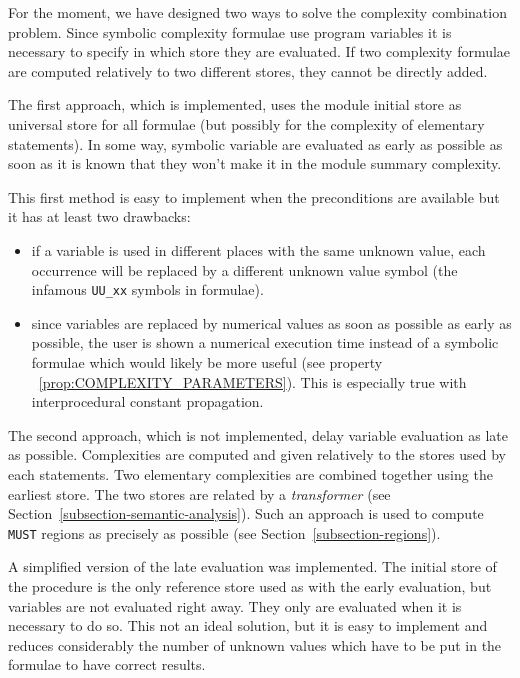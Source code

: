 \documentclass[a4paper]{report}
\newcommand{\PipsPropRef}[1]{\texttt{\detokenize{#1}}~\ref{prop:#1}}
\begin{document}
For the moment, we have designed two ways to solve the complexity
combination problem. Since symbolic complexity formulae use program
variables it is necessary to specify in which store they are
evaluated. If two complexity formulae are computed relatively to two
different stores, they cannot be directly added.

The first approach, which is implemented, uses the module initial store
as universal store for all formulae (but possibly for the complexity of
elementary statements).  In some way, symbolic variable are evaluated as
early as possible as soon as it is known that they won't make it in the
module summary complexity.

This first method is easy to implement when the preconditions are available
but it has at least two drawbacks:

\begin{itemize}

  \item if a variable is used in different places with the same unknown
value, each occurrence will be replaced by a different unknown value
symbol (the infamous \verb+UU_xx+ symbols in formulae).

  \item since variables are replaced by numerical values as soon as
possible as early as possible, the user is shown a numerical execution
time instead of a symbolic formulae which would likely be more useful
(see property \PipsPropRef{COMPLEXITY_PARAMETERS}). This is especially true
with interprocedural constant propagation.

\end{itemize}

The second approach, which is not implemented, delay variable evaluation
as late as possible. Complexities are computed and given relatively to
the stores used by each statements. Two elementary complexities are combined
together using the earliest store. The two stores are related by a {\em
transformer} (see Section~\ref{subsection-semantic-analysis}). Such an
approach is used to compute {\tt MUST} regions as precisely as possible
(see Section~\ref{subsection-regions}).

A simplified version of the late evaluation was implemented. The initial
store of the procedure is the only reference store used as with the
early evaluation, but variables are not evaluated right away. They only
are evaluated when it is necessary to do so. This not an ideal solution,
but it is easy to implement and reduces considerably the number of
unknown values which have to be put in the formulae to have correct
results.
\end{document}
